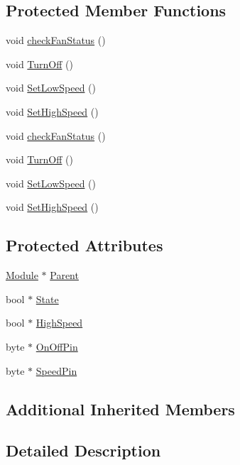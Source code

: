 \subsection*{Protected Member Functions}
\begin{DoxyCompactItemize}
\item 
void \hyperlink{class_fan_a32c99a0575098a2600ea3c9f27013a98}{check\+Fan\+Status} ()
\item 
void \hyperlink{class_fan_af5a22c8800d5a4f3295f44a313af71d2}{Turn\+Off} ()
\item 
void \hyperlink{class_fan_a817f97adfe3990ef302f49359b3237f7}{Set\+Low\+Speed} ()
\item 
void \hyperlink{class_fan_ad462f4c80b5024a1266e0a070527425e}{Set\+High\+Speed} ()
\item 
void \hyperlink{class_fan_a32c99a0575098a2600ea3c9f27013a98}{check\+Fan\+Status} ()
\item 
void \hyperlink{class_fan_af5a22c8800d5a4f3295f44a313af71d2}{Turn\+Off} ()
\item 
void \hyperlink{class_fan_a817f97adfe3990ef302f49359b3237f7}{Set\+Low\+Speed} ()
\item 
void \hyperlink{class_fan_ad462f4c80b5024a1266e0a070527425e}{Set\+High\+Speed} ()
\end{DoxyCompactItemize}
\subsection*{Protected Attributes}
\begin{DoxyCompactItemize}
\item 
\hyperlink{class_module}{Module} $\ast$ \hyperlink{class_fan_ab57a7efd60bf06472195dd1d63f0017f}{Parent}
\item 
bool $\ast$ \hyperlink{class_fan_afa0b370b3ffa913fdc1d5f06db1e06e3}{State}
\item 
bool $\ast$ \hyperlink{class_fan_ac2c512f092cf8f435c1bdbb4278ccebe}{High\+Speed}
\item 
byte $\ast$ \hyperlink{class_fan_afceba9bad8155187a7f2aea415f46a79}{On\+Off\+Pin}
\item 
byte $\ast$ \hyperlink{class_fan_ade9d2ab9b86bc3866a65f30e1964b746}{Speed\+Pin}
\end{DoxyCompactItemize}
\subsection*{Additional Inherited Members}


\subsection{Detailed Description}


